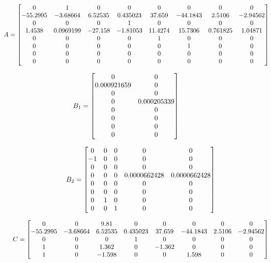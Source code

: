 \documentclass[]{report}
\begin{document}
	\[
	\hspace{-1cm}
A =
\begin{bmatrix}
	0 & 1 & 0 & 0 & 0 & 0 & 0 & 0 \\
	-55.2995 & -3.68664 & 6.52535 & 0.435023 & 37.659 & -44.1843 & 2.5106 & -2.94562 \\
	0 & 0 & 0 & 1 & 0 & 0 & 0 & 0 \\
	1.4538 & 0.0969199 & -27.158 & -1.81053 & 11.4274 & 15.7306 & 0.761825 & 1.04871 \\
	0 & 0 & 0 & 0 & 1 & 0 & 0 & 0 \\
	0 & 0 & 0 & 0 & 0 & 1 & 0 & 0 \\
	0 & 0 & 0 & 0 & 0 & 0 & 0 & 0 \\
	0 & 0 & 0 & 0 & 0 & 0 & 0 & 0
\end{bmatrix}
	\]



\begin{minipage}{0.45\textwidth}
	\[
	\hspace{-2cm}
	B_1 =
	\begin{bmatrix}
		0 & 0 \\
		0.000921659 & 0 \\
		0 & 0 \\
		0 & 0.000205339 \\
		0 & 0 \\
		0 & 0 \\
		0 & 0 \\
		0 & 0
	\end{bmatrix}
	\]
\end{minipage}
\noindent
\begin{minipage}{0.45\textwidth}
	\[
	\hspace{-0.5cm}
	B_2 =
	\begin{bmatrix}
		0 & 0 & 0 & 0 & 0 \\
		-1 & 0 & 0 & 0 & 0 \\
		0 & 0 & 0 & 0 & 0 \\
		0 & 0 & 0 & 0.0000662428 & 0.0000662428 \\
		0 & 0 & 0 & 0 & 0 \\
		0 & 0 & 0 & 0 & 0 \\
		0 & 1 & 0 & 0 & 0 \\
		0 & 0 & 1 & 0 & 0
	\end{bmatrix}
	\]
\end{minipage}

\[
\hspace{-0.5cm}
C =
\begin{bmatrix}
	0 & 0 & 9.81 & 0 & 0 & 0 & 0 & 0 \\
	-55.2995 & -3.68664 & 6.52535 & 0.435023 & 37.659 & -44.1843 & 2.5106 & -2.94562 \\
	0 & 0 & 0 & 1 & 0 & 0 & 0 & 0 \\
	1 & 0 & 1.362 & 0 & -1.362 & 0 & 0 & 0 \\
	1 & 0 & -1.598 & 0 & 0 & 1.598 & 0 & 0
\end{bmatrix}
\]
\end{document}
